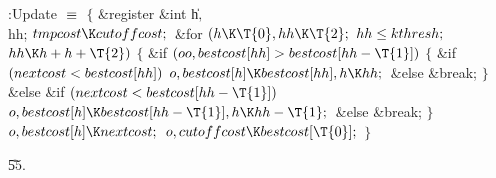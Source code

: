 \Y\B\4:Update \X${}\equiv{}$\6
${}\{{}$\1\6
\&{register} \&{int} \|h${},{}$ \\{hh};\7
${}\\{tmpcost}\K\\{cutoffcost};{}$\6
\&{for} ${}(\|h\K\T{0},\39\\{hh}\K\T{2};{}$ ${}\\{hh}\le\\{kthresh};{}$ ${}%
\\{hh}\K\|h+\|h+\T{2}){}$\5
${}\{{}$\1\6
\&{if} ${}(\\{oo},\39\\{bestcost}[\\{hh}]>\\{bestcost}[\\{hh}-\T{1}]){}$\5
${}\{{}$\1\6
\&{if} ${}(\\{nextcost}<\\{bestcost}[\\{hh}]){}$\1\5
${}\|o,\39\\{bestcost}[\|h]\K\\{bestcost}[\\{hh}],\39\|h\K\\{hh};{}$\2\6
\&{else}\1\5
\&{break};\2\6
\4${}\}{}$\5
\2\&{else} \&{if} ${}(\\{nextcost}<\\{bestcost}[\\{hh}-\T{1}]){}$\1\5
${}\|o,\39\\{bestcost}[\|h]\K\\{bestcost}[\\{hh}-\T{1}],\39\|h\K\\{hh}-%
\T{1};{}$\2\6
\&{else}\1\5
\&{break};\2\6
\4${}\}{}$\2\6
${}\|o,\39\\{bestcost}[\|h]\K\\{nextcost};{}$\6
${}\|o,\39\\{cutoffcost}\K\\{bestcost}[\T{0}];{}$\6
\4${}\}{}$\2\par
\U55.\fi

